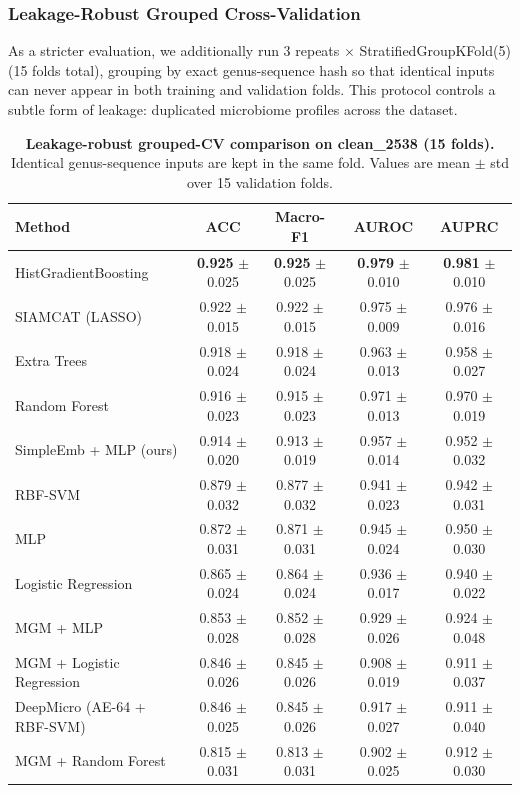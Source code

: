 \documentclass[11pt,a4paper]{article}
\begin{document}
\subsubsection{Leakage-Robust Grouped Cross-Validation}

As a stricter evaluation, we additionally run 3 repeats $\times$ StratifiedGroupKFold(5) (15 folds total), grouping by exact genus-sequence hash so that identical inputs can never appear in both training and validation folds. This protocol controls a subtle form of leakage: duplicated microbiome profiles across the dataset.

\begin{table}[ht]
\centering
\caption{\textbf{Leakage-robust grouped-CV comparison on clean\_2538 (15 folds).}
Identical genus-sequence inputs are kept in the same fold.
Values are mean $\pm$ std over 15 validation folds.}
\label{tab:groupcv}
\begin{tabular}{lcccc}
\toprule
\textbf{Method} & \textbf{ACC} & \textbf{Macro-F1} & \textbf{AUROC} & \textbf{AUPRC} \\
\midrule
HistGradientBoosting & \textbf{0.925} $\pm$ 0.025 & \textbf{0.925} $\pm$ 0.025 & \textbf{0.979} $\pm$ 0.010 & \textbf{0.981} $\pm$ 0.010 \\
SIAMCAT (LASSO) & 0.922 $\pm$ 0.015 & 0.922 $\pm$ 0.015 & 0.975 $\pm$ 0.009 & 0.976 $\pm$ 0.016 \\
Extra Trees & 0.918 $\pm$ 0.024 & 0.918 $\pm$ 0.024 & 0.963 $\pm$ 0.013 & 0.958 $\pm$ 0.027 \\
Random Forest & 0.916 $\pm$ 0.023 & 0.915 $\pm$ 0.023 & 0.971 $\pm$ 0.013 & 0.970 $\pm$ 0.019 \\
SimpleEmb + MLP (ours) & 0.914 $\pm$ 0.020 & 0.913 $\pm$ 0.019 & 0.957 $\pm$ 0.014 & 0.952 $\pm$ 0.032 \\
RBF-SVM & 0.879 $\pm$ 0.032 & 0.877 $\pm$ 0.032 & 0.941 $\pm$ 0.023 & 0.942 $\pm$ 0.031 \\
MLP & 0.872 $\pm$ 0.031 & 0.871 $\pm$ 0.031 & 0.945 $\pm$ 0.024 & 0.950 $\pm$ 0.030 \\
Logistic Regression & 0.865 $\pm$ 0.024 & 0.864 $\pm$ 0.024 & 0.936 $\pm$ 0.017 & 0.940 $\pm$ 0.022 \\
MGM + MLP & 0.853 $\pm$ 0.028 & 0.852 $\pm$ 0.028 & 0.929 $\pm$ 0.026 & 0.924 $\pm$ 0.048 \\
MGM + Logistic Regression & 0.846 $\pm$ 0.026 & 0.845 $\pm$ 0.026 & 0.908 $\pm$ 0.019 & 0.911 $\pm$ 0.037 \\
DeepMicro (AE-64 + RBF-SVM) & 0.846 $\pm$ 0.025 & 0.845 $\pm$ 0.026 & 0.917 $\pm$ 0.027 & 0.911 $\pm$ 0.040 \\
MGM + Random Forest & 0.815 $\pm$ 0.031 & 0.813 $\pm$ 0.031 & 0.902 $\pm$ 0.025 & 0.912 $\pm$ 0.030 \\
\bottomrule
\end{tabular}
\end{table}
\end{document}

